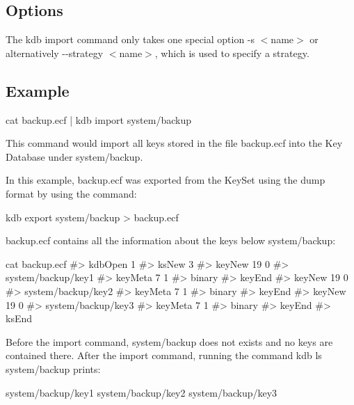 \subsection*{Options}

The kdb import command only takes one special option {\ttfamily -\/s $<$name$>$} or alternatively {\ttfamily -\/-\/strategy $<$name$>$}, which is used to specify a strategy.

\subsection*{Example}


\begin{DoxyCode}
cat backup.ecf | kdb import system/backup
\end{DoxyCode}


This command would import all keys stored in the file {\ttfamily backup.\+ecf} into the Key Database under {\ttfamily system/backup}.

In this example, {\ttfamily backup.\+ecf} was exported from the Key\+Set using the dump format by using the command\+:


\begin{DoxyCode}
kdb export system/backup > backup.ecf
\end{DoxyCode}


{\ttfamily backup.\+ecf} contains all the information about the keys below {\ttfamily system/backup}\+:


\begin{DoxyCode}
cat backup.ecf
#> kdbOpen 1
#> ksNew 3
#> keyNew 19 0
#> system/backup/key1
#> keyMeta 7 1
#> binary
#> keyEnd
#> keyNew 19 0
#> system/backup/key2
#> keyMeta 7 1
#> binary
#> keyEnd
#> keyNew 19 0
#> system/backup/key3
#> keyMeta 7 1
#> binary
#> keyEnd
#> ksEnd
\end{DoxyCode}


Before the import command, {\ttfamily system/backup} does not exists and no keys are contained there. After the import command, running the command {\ttfamily kdb ls system/backup} prints\+:


\begin{DoxyCode}
system/backup/key1
system/backup/key2
system/backup/key3
\end{DoxyCode}
 